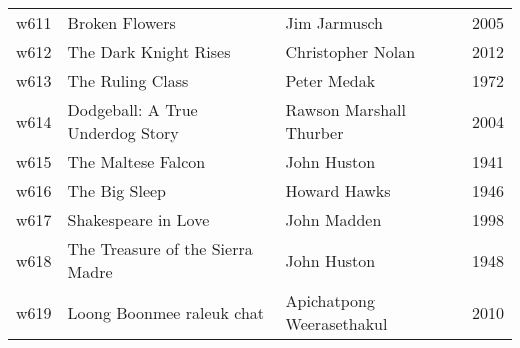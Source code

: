 \documentclass{article}
\begin{document}
\begin {center}
\begin{longtable}{l p{10cm} l l}
w611 & Broken Flowers & Jim Jarmusch & 2005 \\
w612 & The Dark Knight Rises & Christopher Nolan & 2012 \\
w613 & The Ruling Class & Peter Medak & 1972 \\
w614 & Dodgeball: A True Underdog Story & Rawson Marshall Thurber & 2004 \\
w615 & The Maltese Falcon & John Huston & 1941 \\
w616 & The Big Sleep & Howard Hawks & 1946 \\
w617 & Shakespeare in Love & John Madden & 1998 \\
w618 & The Treasure of the Sierra Madre & John Huston & 1948 \\
w619 & Loong Boonmee raleuk chat & Apichatpong Weerasethakul & 2010 \\
\hline
\end{longtable}
\end{center}
\end{document}
